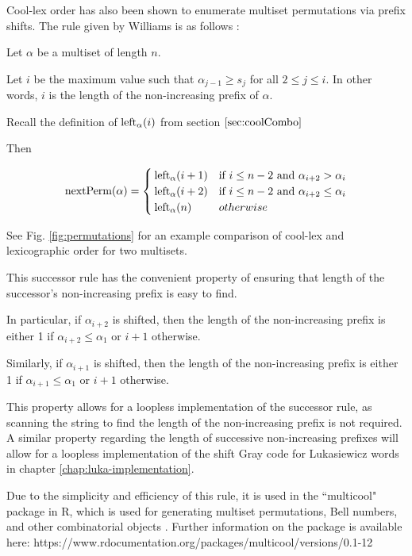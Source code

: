 Cool-lex order has also been shown to enumerate multiset permutations via prefix shifts.  The rule given by Williams is as follows \cite{williams2009loopless}:

 Let $\alpha$ be a multiset of length $n$.

 Let $i$ be the maximum value such that $\alpha_{j-1} \ge s_j$ for all $2 \le j \le i$.  In other words, $i$ is the length of the non-increasing prefix of $\alpha$.  

Recall the definition of $\leftshift[\alpha]{i}$ from section $\ref{sec:coolCombo}$



Then

\begin{equation*}
    \text{nextPerm}(\alpha) = \begin{cases}
	\leftshift[\alpha]{i+1} & \text{if $i \le n-2$ and $\alpha_{i+2} > \alpha_i$}\\
	\leftshift[\alpha]{i+2} & \text{if $i \le n-2$ and $\alpha_{i+2} \le \alpha_i$}\\
	\leftshift[\alpha]{n} & otherwise\\
\end{cases}
\end{equation*}


See Fig. \ref{fig:permutations} for an example comparison of cool-lex and lexicographic order for two multisets.

This successor rule has the convenient property of ensuring that length of the successor's non-increasing prefix is easy to find.

In particular, if $\alpha_{i+2}$ is shifted, then the length of the non-increasing prefix is either 1 if $\alpha_{i+2}\le \alpha_1$ or $i+1$ otherwise. 

Similarly, if $\alpha_{i+1}$ is shifted, then the length of the non-increasing prefix is either 1 if $\alpha_{i+1}\le \alpha_1$ or $i+1$ otherwise. 


This property allows for a loopless implementation of the successor rule, as scanning the string to find the length of the non-increasing prefix is not required.  
A similar property regarding the length of successive non-increasing prefixes will allow for a loopless implementation of the shift Gray code for Lukasiewicz words in chapter \ref{chap:luka-implementation}.

Due to the simplicity and efficiency of this rule, it is used in the ``multicool" package in R, which is used for generating multiset permutations, Bell numbers, and other combinatorial objects \cite{multicool_2021}.   Further information on the package is available here: https://www.rdocumentation.org/packages/multicool/versions/0.1-12





